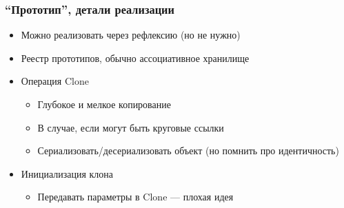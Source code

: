 \documentclass{../cscslides}
\begin{document}
    \begin{frame}
        \frametitle{``Прототип'', детали реализации}
        \begin{itemize}
            \item Можно реализовать через рефлексию (но не нужно)
            \item Реестр прототипов, обычно ассоциативное хранилище
            \item Операция Clone
            \begin{itemize}
                \item Глубокое и мелкое копирование
                \item В случае, если могут быть круговые ссылки
                \item Сериализовать/десериализовать объект (но помнить про идентичность)
            \end{itemize}
            \item Инициализация клона
            \begin{itemize}
                \item Передавать параметры в Clone --- плохая идея
            \end{itemize}
        \end{itemize}
    \end{frame}
\end{document}
